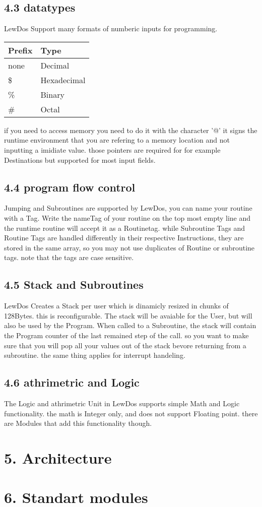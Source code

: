 \documentclass[12pt, letterpaper]{article}
\begin{document}
\subsection*{4.3 datatypes}
LewDos Support many formats of numberic inputs for programming. \\
\begin{tabularx}{\textwidth}{|l|X|}
    \hline
    Prefix & Type \\
    \hline
    none & Decimal \\
    \hline
    \$ & Hexadecimal \\
    \hline
    \% & Binary \\
    \hline
    \# & Octal \\
    \hline
\end{tabularx}
if you need to access memory you need to do it with the character '@' it signs the runtime environment that you are refering to a memory location and not inputting a imidiate value.
those pointers are required for for example Destinations but supported for most input fields.
\subsection*{4.4 program flow control}
Jumping and Subroutines are supported by LewDos, you can name your routine with a Tag. Write the nameTag of your routine on the top most empty line and the runtime routine will 
accept it as a Routinetag. while Subroutine Tags and Routine Tags are handled differently in their respective Instructions, they are stored in the same array, so you may not use
duplicates of Routine or subroutine tags. note that the tags are case sensitive.
\newpage
\subsection*{4.5 Stack and Subroutines}
LewDos Creates a Stack per user which is dinamicly resized in chunks of 128Bytes. this is reconfigurable. The stack will be avaiable for the User, but will also be used by the Program.
When called to a Subroutine, the stack will contain the Program counter of the last remained step of the call. so you want to make sure that you will pop all your values out of the stack
bevore returning from a subroutine. the same thing applies for interrupt handeling.
\subsection*{4.6 athrimetric and Logic}
The Logic and athrimetric Unit in LewDos supports simple Math and Logic functionality. the math is Integer only, and does not support Floating point. there are Modules that add this functionality though.
\section*{5. Architecture}
\section*{6. Standart modules} %
\end{document}

